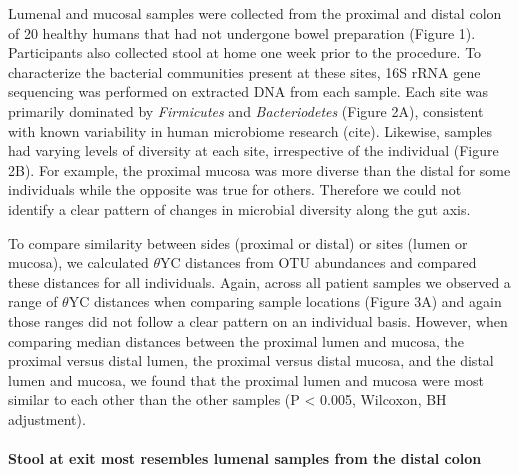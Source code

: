 \documentclass[11pt,]{article}
\let\oldparagraph\paragraph
\renewcommand{\paragraph}[1]{\oldparagraph{#1}\mbox{}}
\begin{document}
Lumenal and mucosal samples were collected from the proximal and distal
colon of 20 healthy humans that had not undergone bowel preparation
(Figure 1). Participants also collected stool at home one week prior to
the procedure. To characterize the bacterial communities present at
these sites, 16S rRNA gene sequencing was performed on extracted DNA
from each sample. Each site was primarily dominated by \emph{Firmicutes}
and \emph{Bacteriodetes} (Figure 2A), consistent with known variability
in human microbiome research (cite). Likewise, samples had varying
levels of diversity at each site, irrespective of the individual (Figure
2B). For example, the proximal mucosa was more diverse than the distal
for some individuals while the opposite was true for others. Therefore
we could not identify a clear pattern of changes in microbial diversity
along the gut axis.

To compare similarity between sides (proximal or distal) or sites (lumen
or mucosa), we calculated \({\theta}\)YC distances from OTU abundances
and compared these distances for all individuals. Again, across all
patient samples we observed a range of \({\theta}\)YC distances when
comparing sample locations (Figure 3A) and again those ranges did not
follow a clear pattern on an individual basis. However, when comparing
median distances between the proximal lumen and mucosa, the proximal
versus distal lumen, the proximal versus distal mucosa, and the distal
lumen and mucosa, we found that the proximal lumen and mucosa were most
similar to each other than the other samples (P \textless{} 0.005,
Wilcoxon, BH adjustment).

\paragraph{Stool at exit most resembles lumenal samples from the distal
colon}\label{stool-at-exit-most-resembles-lumenal-samples-from-the-distal-colon}
\end{document}
